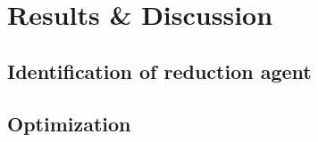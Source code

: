 \section{Results \& Discussion}
\label{sec:ResAndDisc}


\subsection{Identification of reduction agent}

\subsection{Optimization}
